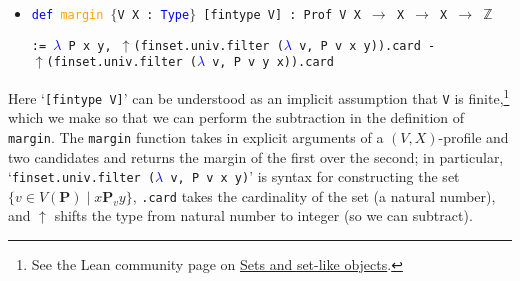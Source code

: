\documentclass[runningheads]{llncs}
\begin{document}
\begin{itemize}
\item[] \texttt{\textcolor{blue}{def} \textcolor{orange}{margin} $\{$V X : \textcolor{blue}{Type}$\}$  [fintype V] : Prof V X $\to$ X $\to$ X $\to$ $\mathbb{Z}$} 

\texttt{:=
    \textcolor{blue}{$\lambda$} P x y, $\uparrow$(finset.univ.filter (\textcolor{blue}{$\lambda$} v, P v x y)).card
        -} \\ \texttt{$\uparrow$(finset.univ.filter (\textcolor{blue}{$\lambda$} v, P v y x)).card}
\end{itemize}
Here `\texttt{[fintype V]}' can be understood as an implicit assumption that \texttt{V} is finite,\footnote{See the Lean community page on \href{https://leanprover-community.github.io/theories/sets.html\#finite-types}{Sets and set-like objects}.} which we make so that we can perform the subtraction in the definition of \texttt{margin}. The \texttt{margin} function takes in explicit arguments of a $(V,X)$-profile and two candidates  and returns the margin of the first over the second; in particular, `\texttt{finset.univ.filter (\textcolor{blue}{$\lambda$} v, P v x y)}' is syntax for constructing  the set \\ $\{v\in V(\mathbf{P})\mid x\mathbf{P}_v y\}$, \texttt{.card} takes the cardinality of the set (a natural number), and $\uparrow$ shifts the type from natural number to integer (so we can subtract).

\begin{comment}
In a profile $\mathbf{P}$, we say that $x$ is \textit{majority preferred} to $y$ if the margin of $x$ over $y$ is positive, formalized as follows:
\begin{itemize}
\item[] \texttt{\textcolor{blue}{def} \textcolor{orange}{margin\_pos} [fintype V] : Profile V X $\to$ X $\to$ X $\to$ \textcolor{blue}{Prop} :=}
\\ \texttt{\textcolor{blue}{$\lambda$} P x y, 0 < (margin P) x y}
\end{itemize}
So \texttt{margin\_pos} is a function that takes in a $(V,X)$-profile and two candidates and returns the proposition that the first is majority preferred to the second.
\end{comment}
\end{document}
